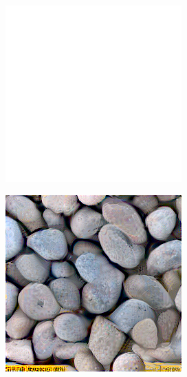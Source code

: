 \begin{figure}[]
\begin{subfigure}{\textwidth}
\begin{subfigure}{0.24\textwidth}
            \includegraphics[width=\textwidth]{images/04-experiment01/pebbles/white_bg.jpg}
            \caption*{}
        \end{subfigure}
        \hfill
        \begin{subfigure}{0.24\textwidth}
            \centering
            \includegraphics[width=\textwidth]{images/04-experiment01/pebbles/1000/white_im.jpg}

\end{subfigure}
\end{subfigure}
\end{figure}
